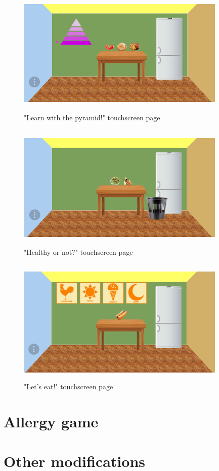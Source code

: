 \begin{figure}[H]
\centering
\includegraphics[width=10cm, height=6cm]{immagini/newpyramid.png}
\caption{"Learn with the pyramid!" touchscreen page}\label{fig:newpyramid}
\end{figure}
\begin{figure}[H]
\centering
\includegraphics[width=10cm, height=6cm]{immagini/newhealthy.png}
\caption{"Healthy or not?" touchscreen page}\label{fig:newhealthy}
\end{figure}
\begin{figure}[H]
\centering
\includegraphics[width=10cm, height=6cm]{immagini/newlet.png}
\caption{"Let's eat!" touchscreen page}\label{fig:newlet}
\end{figure}
\section{Allergy game}
\section{Other modifications}